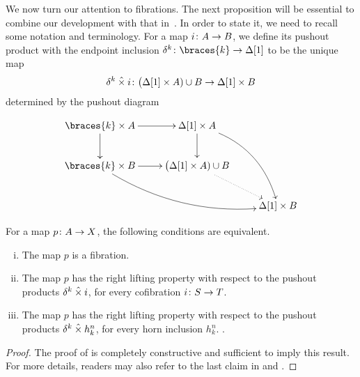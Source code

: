 \documentclass[reqno,10pt,a4paper,oneside,draft]{amsart}
\begin{document}
\medskip

  
We now turn our attention to fibrations. The next proposition will be essential to combine our development with that in~\cite{gambino2017frobenius}.
In order to state it, we need to recall some notation and terminology. For a map $i \colon A \to B$, we define its
pushout product with the endpoint inclusion $\kcyl \co \braces{ k } \to \Delta[1]$ to be the unique map
\[
\delta^k \mathbin{\hat{\times}} i \colon \big( \Delta[1] \times A ) \cup B \to \Delta[1] \times  B
\]
determined by the pushout diagram

\[
\xymatrix{
\braces{ k } \times A \ar[r] \ar[d] &  \Delta[1]  \times A  \ar[d] \ar@/^1.5pc/[ddr] \\
\braces{ k} \times B \ar[r]  \ar@/_1.5pc/[drr] & \big( \Delta[1] \times A ) \cup B \ar@{.>}[dr]  \\
 & &\Delta[1] \times  B }
 \]



\begin{proposition} For a map $p \colon A \to X$, the following conditions are equivalent.
\begin{enumerate}[(i)] 
\item The map $p$ is a fibration.
\item The map $p$ has the right lifting property with respect to the pushout products $ \delta^k  \mathbin{\hat{\times}} i$, for every cofibration $i \colon S \to T$.
\item The map $p$ has the right lifting property with respect to the pushout products $ \delta^k  \mathbin{\hat{\times}} h^n_k$, for every  
horn inclusion $h^n_k$. .
\end{enumerate}
\end{proposition} 

\begin{proof}The proof of \cite[Theorem~3.2.3]{joyal-tierney:simplicial-homotopy-theory} is completely constructive and sufficient to imply this result.
For more details, readers may also refer to the last claim in \cite[Corollary~5.3.2]{henry2018wms}
and \cite[Proposition~5.2.6]{henry2018wms}.
\end{proof}





\bigskip





\end{document}
